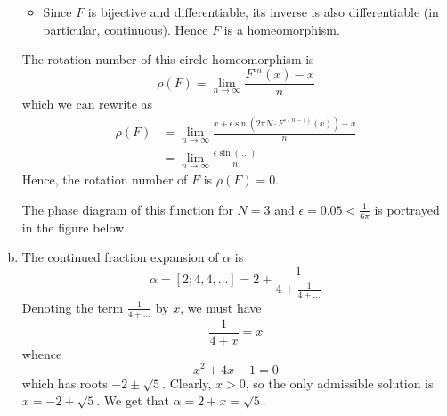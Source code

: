 \begin{problem}
\begin{enumerate}[a)]
\begin{itemize}
        \item Since \(F\) is bijective and differentiable, its inverse is also differentiable (in particular, continuous). Hence \(F\) is a homeomorphism.
    \end{itemize}

    The rotation number of this circle homeomorphism is
    \[
        \rho(F) = \lim_{n \to \infty} \frac{F^{\circ n} (x) - x}{n}
    \]
    which we can rewrite as
    \begin{align*}
        \rho(F) &= \lim_{n \to \infty} \frac{x + \epsilon \sin(2 \pi N \cdot F^{\circ (n - 1)} (x)) - x}{n} \\
        &= \lim_{n \to \infty} \frac{\epsilon \sin(\, \dots)}{n}
    \end{align*}
    Hence, the rotation number of \(F\) is \(\rho(F) = 0\).

    The phase diagram of this function for \(N = 3\) and \(\epsilon = 0.05 < \frac{1}{6 \pi}\) is portrayed in the figure below.
    \begin{figure}[htbp]
        \centering
    \end{figure}

    \item The continued fraction expansion of \(\alpha\) is
    \[
        \alpha = [2; 4, 4, \dots] = 2 + \frac{1}{4 + \frac{1}{4 + \dots}}
    \]
    Denoting the term \(\frac{1}{4 + \dots}\) by \(x\), we must have
    \[
        \frac{1}{4 + x} = x
    \]
    whence
    \[
        x^2 + 4x - 1 = 0
    \]
    which has roots \(-2 \pm \sqrt{5}\). Clearly, \(x > 0\), so the only admissible solution is \(x = -2 + \sqrt{5}\). We get that \(\alpha = 2 + x = \sqrt{5}\).


\end{enumerate}
\end{problem}
